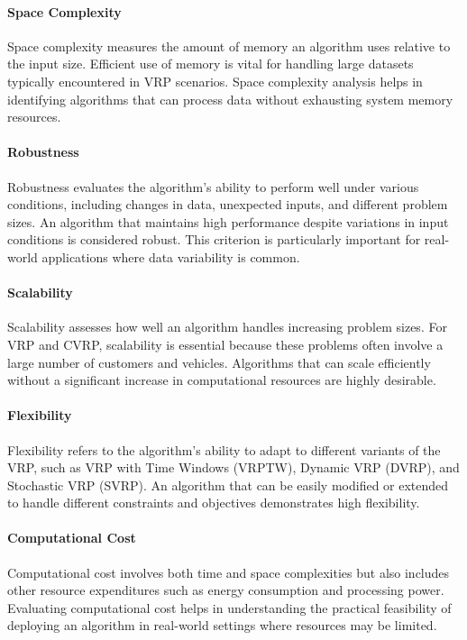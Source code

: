 \documentclass[
]{article}
\begin{document}
    \paragraph{Space Complexity} Space complexity measures the amount of memory an algorithm uses relative to the input size. Efficient use of memory is vital for handling large datasets typically encountered in VRP scenarios. Space complexity analysis helps in identifying algorithms that can process data without exhausting system memory resources.

    \paragraph{Robustness} Robustness evaluates the algorithm’s ability to perform well under various conditions, including changes in data, unexpected inputs, and different problem sizes. An algorithm that maintains high performance despite variations in input conditions is considered robust. This criterion is particularly important for real-world applications where data variability is common.

    \paragraph{Scalability} Scalability assesses how well an algorithm handles increasing problem sizes. For VRP and CVRP, scalability is essential because these problems often involve a large number of customers and vehicles. Algorithms that can scale efficiently without a significant increase in computational resources are highly desirable.

    \paragraph{Flexibility} Flexibility refers to the algorithm’s ability to adapt to different variants of the VRP, such as VRP with Time Windows (VRPTW), Dynamic VRP (DVRP), and Stochastic VRP (SVRP). An algorithm that can be easily modified or extended to handle different constraints and objectives demonstrates high flexibility.

    \paragraph{Computational Cost} Computational cost involves both time and space complexities but also includes other resource expenditures such as energy consumption and processing power. Evaluating computational cost helps in understanding the practical feasibility of deploying an algorithm in real-world settings where resources may be limited.
\end{document}
